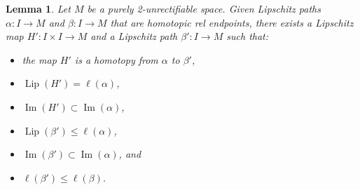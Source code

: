 \documentclass{article}
\newtheorem{lemma}[theorem]{Lemma}
\theoremstyle{definition}
\theoremstyle{remark}
\DeclareMathOperator{\Ima}{Im}
\newcommand{\length}[1]{\ell}%
\DeclareMathOperator{\Lip}{Lip}
\begin{document}
%

\begin{lemma}\label{Desirable homotopy}
Let $M$ be a purely 2-unrectifiable space. Given Lipschitz paths $\alpha:I\rightarrow M$ and $\beta:I\rightarrow M$ that are  homotopic rel endpoints, there exists a Lipschitz map $H':I\times I\rightarrow M$ and a Lipschitz path $\beta':I\rightarrow M$ such that:
\begin{itemize}
\item the map $H'$ is a homotopy from $\alpha$ to $\beta'$,
\item $\Lip(H')=\length{M}(\alpha)$,
\item $\Ima(H')\subset\Ima(\alpha)$,
\item $\Lip(\beta')\leq \length{M}(\alpha)$,
\item $\Ima(\beta')\subset\Ima(\alpha)$, and
\item $\length{M}(\beta')\leq\length{M}(\beta)$.
\end{itemize}
\end{lemma}
\end{document}
